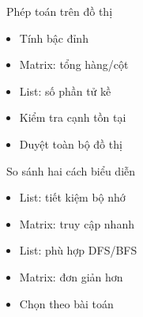 \documentclass{beamer}
\begin{document}
\begin{frame}{\faCalculator\ Phép toán trên đồ thị}
\begin{tcolorbox}
\begin{itemize}
\item Tính bậc đỉnh
\item Matrix: tổng hàng/cột
\item List: số phần tử kề
\item Kiểm tra cạnh tồn tại
\item Duyệt toàn bộ đồ thị
\end{itemize}
\end{tcolorbox}
\end{frame}

\begin{frame}{\faBalanceScale\ So sánh hai cách biểu diễn}
\begin{tcolorbox}
\begin{itemize}
\item List: tiết kiệm bộ nhớ
\item Matrix: truy cập nhanh
\item List: phù hợp DFS/BFS
\item Matrix: đơn giản hơn
\item Chọn theo bài toán
\end{itemize}
\end{tcolorbox}
\end{frame}
\end{document}
